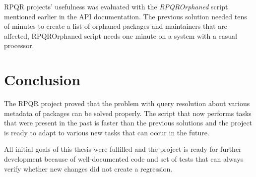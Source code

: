 RPQR projects' usefulness was evaluated with the \textit{RPQROrphaned} script mentioned earlier in
the API documentation. The previous solution needed tens of minutes to create a list of orphaned packages
and maintainers that are affected, RPQROrphaned script needs one minute on a system with a casual processor.

\chapter{Conclusion}

The RPQR project proved that the problem with query resolution about various metadata of packages can
be solved properly. The script that now performs tasks that were present in the past is faster than the
previous solutions and the project is ready to adapt to various new tasks that can occur in the future.

All initial goals of this thesis were fulfilled and the project is ready for further development because
of well-documented code and set of tests that can always verify whether new changes did not create a
regression.
